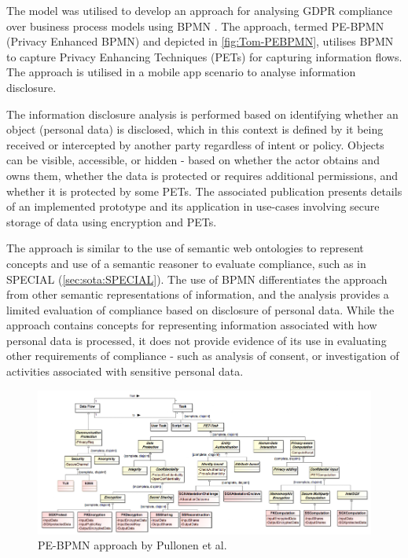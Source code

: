 The model was utilised to develop an approach for analysing GDPR compliance over business process models using BPMN \cite{pullonen_privacy-enhanced_2019}.
The approach, termed PE-BPMN (Privacy Enhanced BPMN) and depicted in \autoref{fig:Tom-PEBPMN}, utilises BPMN to capture Privacy Enhancing Techniques (PETs) for capturing information flows. The approach is utilised in a mobile app scenario to analyse information disclosure.

The information disclosure analysis is performed based on identifying whether an object (personal data) is disclosed, which in this context is defined by it being received or intercepted by another party regardless of intent or policy. Objects can be visible, accessible, or hidden - based on whether the actor obtains and owns them, whether the data is protected or requires additional permissions, and whether it is protected by some PETs. The associated publication \cite{pullonen_privacy-enhanced_2019} presents details of an implemented prototype and its application in use-cases involving secure storage of data using encryption and PETs. 

The approach is similar to the use of semantic web ontologies to represent concepts and use of a semantic reasoner to evaluate compliance, such as in SPECIAL (\autoref{sec:sota:SPECIAL}). The use of BPMN differentiates the approach from other semantic representations of information, and the analysis provides a limited evaluation of compliance based on disclosure of personal data. While the approach contains concepts for representing information associated with how personal data is processed, it does not provide evidence of its use in evaluating other requirements of compliance - such as analysis of consent, or investigation of activities associated with sensitive personal data.
\begin{figure}[htbp]
    \centering
    \includegraphics[width=\linewidth]{img/Tom_PEBPMN.png}
    \caption{PE-BPMN approach by Pullonen et al. \cite{pullonen_privacy-enhanced_2019}}
    \label{fig:Tom-PEBPMN}
\end{figure}


